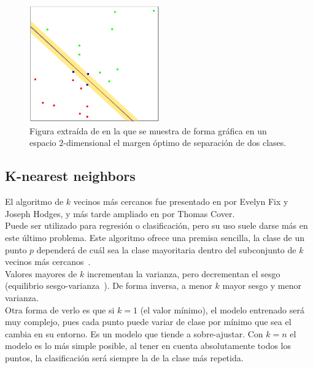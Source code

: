 \begin{figure}[H]
    \begin{center}
        \includegraphics[width=0.5\textwidth]{imagenes/svm-margin.png}
    \end{center}
    \caption[Margen en SVM]{Figura extraída de \cite{hastie2009elements} en la que se muestra de forma gráfica en un espacio $2$-dimensional el margen óptimo de separación de dos clases.}
\end{figure}

\subsection{K-nearest neighbors}
El algoritmo de $k$ vecinos más cercanos fue presentado en \cite{fix_discriminatory_1989} por Evelyn Fix y Joseph Hodges, y más tarde ampliado en \cite{cover_nearest_1967} por Thomas Cover.\\[6pt]
Puede ser utilizado para regresión o clasificación, pero su uso suele darse más en este último problema. Este algoritmo ofrece una premisa sencilla, la clase de un punto $p$ dependerá de cuál sea la clase mayoritaria dentro del subconjunto de $k$ vecinos más cercanos~\cite{10.1007/978-3-540-39964-3_62}.\\[6pt]
Valores mayores de $k$ incrementan la varianza, pero decrementan el sesgo (equilibrio sesgo-varianza~\cite{Mostafa2012}). De forma inversa, a menor $k$ mayor sesgo y menor varianza.\\[6pt]
Otra forma de verlo es que si $k=1$ (el valor mínimo), el modelo entrenado será muy complejo, pues cada punto puede variar de clase por mínimo que sea el cambia en su entorno. Es un modelo que tiende a sobre-ajustar. Con $k=n$ el modelo es lo más simple posible, al tener en cuenta absolutamente todos los puntos, la clasificación será siempre la de la clase más repetida.